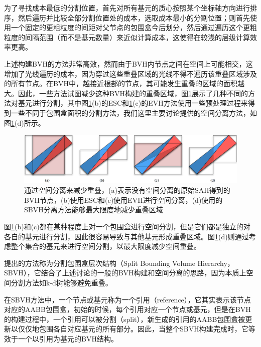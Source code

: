 为了寻找成本最低的分割位置，\cite{a:Ray-Tracing-Deterministic-3-DFractals}首先对所有基元的质心按照某个坐标轴方向进行排序，然后遍历并比较全部分割位置处的成本，选取成本最小的分割位置；\cite{b:pbrt}则首先使用一个固定的更粗粒度的间距对父节点的包围盒今后划分，然后通过遍历这个更粗粒度的间隔范围（而不是基元数量）来近似计算成本，这使得在较浅的层级计算效率更高。

上述构建BVH的方法非常高效，然而由于BVH内节点之间在空间上可能相交，这增加了光线遍历的成本，因为穿过这些重叠区域的光线不得不遍历该重叠区域涉及的所有节点。在BVH中，越接近根部的节点，其可能发生重叠的区域的面积越大。因此，一些方法试图减少这种BVH构建的重叠区域，图\ref{f:pt-sbvh}展示了几种不同的方法对基元进行分割，其中图\ref{f:pt-sbvh}(b)\cite{a:EarlySplitClippingforBoundingVolumeHierarchies}的ESC和\ref{f:pt-sbvh}(c)\cite{a:TheEdgeVolumeHeuristicRobustTriangleSubdivisionforImprovedBVHPer-formance}的EVH方法使用一些预处理过程来得到一些不同于包围盒面积的分割方法，我们这里主要讨论\cite{a:SpatialSplitsinBoundingVolumeHierarchies}提供的空间分离方法，如图\ref{f:pt-sbvh}(d)所示。

\begin{figure}
	\includegraphics[width=1.0\textwidth]{figures/pt/sbvh}
	\caption{通过空间分离来减少重叠，(a)表示没有空间分离的原始SAH得到的BVH节点，(b)使用ESC和(c)使用EVH进行空间分离，(d)使用的SBVH分离方法能够最大限度地减少重叠区域}
	\label{f:pt-sbvh}
\end{figure}

图\ref{f:pt-sbvh}(b)和(c)都在某种程度上对一个包围盒进行空间分割，但是它们都是独立的对各自的基元进行分割，因此很容易导致与其他基元形成重叠区域。图\ref{f:pt-sbvh}(d)则通过考虑整个集合的基元来进行空间分割，以最大限度减少空间重叠。

\cite{a:SpatialSplitsinBoundingVolumeHierarchies}提出的方法称为分割包围盒层次结构（Split Bounding Volume Hierarchy，SBVH），它结合了上述讨论的一般的BVH构建和空间分离的思路，因为本质上空间分割方法如k-d树能够避免重叠。

在SBVH方法中，一个节点或基元称为一个引用（reference），它其实表示该节点对应的AABB包围盒，初始的时候，每个引用对应一个节点或基元，但是在BVH的构建过程中，一个引用可以被分割（split），新生成的引用的AABB包围盒被更新以仅仅地包围各自对应基元的所有部分。因此，当整个SBVH构建完成时，它等效于一个以引用为基元的BVH结构。

